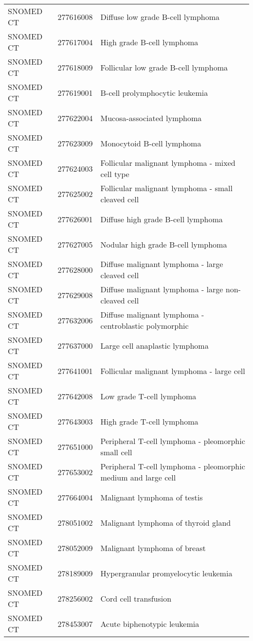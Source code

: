 \begin{table}[ht]
\begin{tabular}{lll}
  SNOMED CT & 277616008 & Diffuse low grade B-cell lymphoma \\ 
  SNOMED CT & 277617004 & High grade B-cell lymphoma \\ 
  SNOMED CT & 277618009 & Follicular low grade B-cell lymphoma \\ 
  SNOMED CT & 277619001 & B-cell prolymphocytic leukemia \\ 
  SNOMED CT & 277622004 & Mucosa-associated lymphoma \\ 
  SNOMED CT & 277623009 & Monocytoid B-cell lymphoma \\ 
  SNOMED CT & 277624003 & Follicular malignant lymphoma - mixed cell type \\ 
  SNOMED CT & 277625002 & Follicular malignant lymphoma - small cleaved cell \\ 
  SNOMED CT & 277626001 & Diffuse high grade B-cell lymphoma \\ 
  SNOMED CT & 277627005 & Nodular high grade B-cell lymphoma \\ 
  SNOMED CT & 277628000 & Diffuse malignant lymphoma - large cleaved cell \\ 
  SNOMED CT & 277629008 & Diffuse malignant lymphoma - large non-cleaved cell \\ 
  SNOMED CT & 277632006 & Diffuse malignant lymphoma - centroblastic polymorphic \\ 
  SNOMED CT & 277637000 & Large cell anaplastic lymphoma \\ 
  SNOMED CT & 277641001 & Follicular malignant lymphoma - large cell \\ 
  SNOMED CT & 277642008 & Low grade T-cell lymphoma \\ 
  SNOMED CT & 277643003 & High grade T-cell lymphoma \\ 
  SNOMED CT & 277651000 & Peripheral T-cell lymphoma - pleomorphic small cell \\ 
  SNOMED CT & 277653002 & Peripheral T-cell lymphoma - pleomorphic medium and large cell \\ 
  SNOMED CT & 277664004 & Malignant lymphoma of testis \\ 
  SNOMED CT & 278051002 & Malignant lymphoma of thyroid gland \\ 
  SNOMED CT & 278052009 & Malignant lymphoma of breast \\ 
  SNOMED CT & 278189009 & Hypergranular promyelocytic leukemia \\ 
  SNOMED CT & 278256002 & Cord cell transfusion \\ 
  SNOMED CT & 278453007 & Acute biphenotypic leukemia \\ 

\end{tabular}
\end{table}
